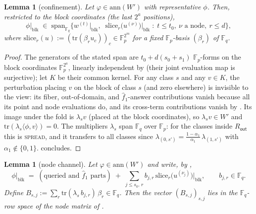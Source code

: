 \documentclass{article}
\newcommand{\Fp}{\mathbb{F}_p}
\newcommand{\Fq}{\mathbb{F}_q}
\newcommand{\extdeg}{d}
\newtheorem{lemma}[theorem]{Lemma}
\theoremstyle{definition}
\begin{document}
\begin{lemma}[confinement]\label{lem:confine}
Let $\varphi \in \mathrm{ann}(W')$ with representative $\phi$. Then, restricted to the block coordinates (the last $2^a$ positions),
\[
\phi\big|_{\mathrm{blk}} \;\in\; \mathrm{span}_{\Fq}\Big\{ w^{(t)}\big|_{\mathrm{blk}},\;\; \mathrm{slice}_r\big(u^{(\nu)}\big)\big|_{\mathrm{blk}} \;:\; t \leq t_0,\ \nu \text{ a node},\ r \leq \extdeg \Big\} ,
\]
where $\mathrm{slice}_r(u) := (\mathrm{tr}(\beta_r u_c))_c \in \Fp^{2^m}$ for a fixed $\Fp$-basis $(\beta_r)$ of $\Fq$.
\end{lemma}

\begin{proof}
The generators of the stated span are $t_0 + \extdeg(s_0 + s_1)$ $\Fp$-forms on the block coordinates $\Fp^{2^a}$, linearly independent by  (their joint evaluation map is surjective); let $K$ be their common kernel. For any class $s$ and any $v \in K$, the perturbation placing $v$ on the block of class $s$ (and zero elsewhere) is invisible to the view: its fiber, out-of-domain, and $\hat{f}_1$-answer contributions vanish because all its point and node evaluations do, and its cross-term contributions vanish by . Its image under the fold is $\lambda_s v$ (placed at the block coordinates), so $\lambda_s v \in W'$ and $\mathrm{tr}(\lambda_s \langle \phi, v \rangle) = 0$. The multipliers $\lambda_s$ span $\Fq$ over $\Fp$: for the classes inside $R_{\mathsf{out}}$ this is \textsc{spread}, and it transfers to all classes since $\lambda_{(0, s')} = \frac{1 - \alpha_1}{\alpha_1}\, \lambda_{(1, s')}$ with $\alpha_1 \notin \{0, 1\}$.  concludes.
\end{proof}

\begin{lemma}[node channel]\label{lem:nodechannel}
Let $\varphi \in \mathrm{ann}(W')$ and write, by ,
\[
\phi|_{\mathrm{blk}} \;=\; (\text{queried and } \hat{f}_1 \text{ parts}) \;+\; \sum_{j \leq s_0,\, r} b_{j,r}\, \mathrm{slice}_r\big(u^{(\nu_j)}\big)\big|_{\mathrm{blk}} , \qquad b_{j,r} \in \Fq .
\]
Define $B_{s, j} := \sum_r \mathrm{tr}(\lambda_s\, b_{j,r})\, \beta_r \in \Fq$. Then the vector $(B_{s,j})_{s,j}$ lies in the $\Fq$-row space of the node matrix of .
\end{lemma}
\end{document}
